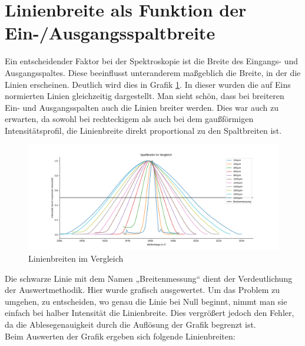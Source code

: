 \section{Linienbreite als Funktion der Ein-/Ausgangsspaltbreite}

Ein entscheidender Faktor bei der Spektroskopie ist die Breite des Eingangs- und Ausgangsspaltes. Diese beeinflusst unteranderem maßgeblich die Breite, 
in der die Linien erscheinen. Deutlich wird dies in Grafik \ref{LinVergleich}. In dieser wurden die auf Eins normierten Linien gleichzeitig dargestellt. 
Man sieht schön, dass bei breiteren Ein- und Ausgangsspalten auch die Linien breiter werden. Dies war auch zu erwarten, da sowohl bei rechteckigem als auch bei 
dem gaußförmigen Intensitätsprofil, die Linienbreite direkt proportional zu den Spaltbreiten ist.
\begin{figure}[h]
    \centering
    \includegraphics[width = \linewidth]{Bilder/LinienbreiteVergleich.png}
    \caption{Linienbreiten im Vergleich}
    \label{LinVergleich}
\end{figure}
Die schwarze Linie mit dem Namen „Breitenmessung“ dient der Verdeutlichung der Auswertmethodik. Hier wurde grafisch ausgewertet. Um das Problem zu umgehen, 
zu entscheiden, wo genau die Linie bei Null beginnt, nimmt man sie einfach bei halber Intensität die Linienbreite. 
Dies vergrößert jedoch den Fehler, da die Ablesegenauigkeit durch die Auflösung der Grafik begrenzt ist.\\
Beim Auswerten der Grafik ergeben sich folgende Linienbreiten:
